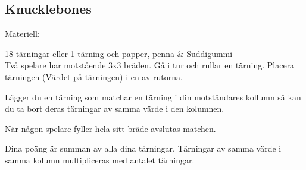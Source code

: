 \subsection*{\textbf{Knucklebones}}

Materiell: 

18 tärningar eller 1 tärning och papper, penna \& Suddigummi\\

Två spelare har motstående 3x3 bräden. Gå i tur och rullar en tärning. Placera tärningen (Värdet på tärningen) i en av rutorna.

Lägger du en tärning som matchar en tärning i din motståndares kollumn så kan du ta bort deras tärningar av samma värde i den kolumnen.

När någon spelare fyller hela sitt bräde avslutas matchen. 

Dina poäng är summan av alla dina tärningar. Tärningar av samma värde i samma kolumn multipliceras med antalet tärningar.

\newpage
